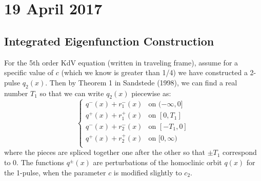 \documentclass[12pt]{article}
\begin{document}
\section*{19 April 2017}

\subsection*{Integrated Eigenfunction Construction}
For the 5th order KdV equation (written in traveling frame), assume for a specific value of $c$ (which we know is greater than 1/4) we have constructed a 2-pulse $q_2(x)$. Then by Theorem 1 in Sandstede (1998), we can find a real number $T_1$ so that we can write $q_2(x)$ piecewise as:\[
\begin{cases}
q^-(x) + r_1^-(x) & \text{on } (-\infty, 0] \\
q^+(x) + r_1^+(x) & \text{on } [0, T_1] \\
q^-(x) + r_2^-(x) & \text{on } [-T_1, 0] \\
q^+(x) + r_2^+(x) & \text{on } [0, \infty) \\ 
\end{cases}
\]
where the pieces are spliced together one after the other so that $\pm T_1$ correspond to 0. The functions $q^\pm(x)$ are perturbations of the homoclinic orbit $q(x)$ for the 1-pulse, when the parameter $c$ is modified slightly to $c_2$.\\
\end{document}
